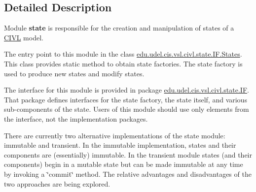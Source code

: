 \subsection{Detailed Description}
Module {\bfseries state} is responsible for the creation and manipulation of states of a \hyperlink{classedu_1_1udel_1_1cis_1_1vsl_1_1civl_1_1CIVL}{C\+I\+V\+L} model. 

The entry point to this module in the class \hyperlink{classedu_1_1udel_1_1cis_1_1vsl_1_1civl_1_1state_1_1IF_1_1States}{edu.\+udel.\+cis.\+vsl.\+civl.\+state.\+I\+F.\+States}. This class provides static method to obtain state factories. The state factory is used to produce new states and modify states.

The interface for this module is provided in package \hyperlink{}{edu.\+udel.\+cis.\+vsl.\+civl.\+state.\+I\+F}. That package defines interfaces for the state factory, the state itself, and various sub-\/components of the state. Users of this module should use only elements from the interface, not the implementation packages.

There are currently two alternative implementations of the state module\+: immutable and transient. In the immutable implementation, states and their components are (essentially) immutable. In the transient module states (and their components) begin in a mutable state but can be made immutable at any time by invoking a \char`\"{}commit\char`\"{} method. The relative advantages and disadvantages of the two approaches are being explored. 